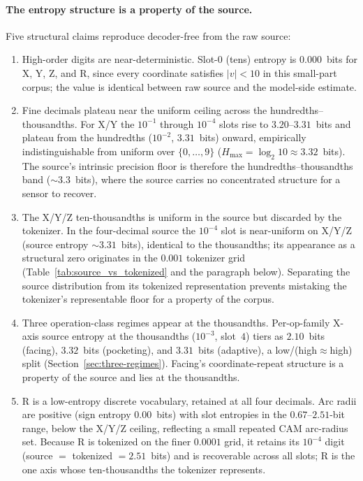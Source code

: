 \documentclass[entropy,article,submit,moreauthors,pdftex]{Definitions/mdpi}
\begin{document}
\paragraph{The entropy structure is a property of the source.} Five structural claims reproduce decoder-free from the raw source:
\begin{enumerate}[label=(\roman*), leftmargin=*, nosep]
\item High-order digits are near-deterministic. Slot-0 (tens) entropy is $0.000$~bits for X, Y, Z, and R, since every coordinate satisfies $|v|<10$ in this small-part corpus; the value is identical between raw source and the model-side estimate.
\item Fine decimals plateau near the uniform ceiling across the hundredths--thousandths. For X/Y the $10^{-1}$ through $10^{-4}$ slots rise to $3.20$--$3.31$~bits and plateau from the hundredths ($10^{-2}$, $3.31$~bits) onward, empirically indistinguishable from uniform over $\{0,\ldots,9\}$ ($H_{\max}=\log_2 10\approx 3.32$~bits). The source's intrinsic precision floor is therefore the hundredths--thousandths band ($\sim\!3.3$~bits), where the source carries no concentrated structure for a sensor to recover.
\item The X/Y/Z ten-thousandths is uniform in the source but discarded by the tokenizer. In the four-decimal source the $10^{-4}$ slot is near-uniform on X/Y/Z (source entropy $\sim\!3.31$~bits), identical to the thousandths; its appearance as a structural zero originates in the $0.001$ tokenizer grid (Table~\ref{tab:source_vs_tokenized} and the paragraph below). Separating the source distribution from its tokenized representation prevents mistaking the tokenizer's representable floor for a property of the corpus.
\item Three operation-class regimes appear at the thousandths. Per-op-family X-axis source entropy at the thousandths ($10^{-3}$, slot~$4$) tiers as $2.10$~bits (facing), $3.32$~bits (pocketing), and $3.31$~bits (adaptive), a low/(high$\approx$high) split (Section~\ref{sec:three-regimes}). Facing's coordinate-repeat structure is a property of the source and lies at the thousandths.
\item R is a low-entropy discrete vocabulary, retained at all four decimals. Arc radii are positive (sign entropy $0.00$~bits) with slot entropies in the $0.67$--$2.51$-bit range, below the X/Y/Z ceiling, reflecting a small repeated CAM arc-radius set. Because R is tokenized on the finer $0.0001$ grid, it retains its $10^{-4}$ digit (source $=$ tokenized $=2.51$~bits) and is recoverable across all slots; R is the one axis whose ten-thousandths the tokenizer represents.
\end{enumerate}
\end{document}

